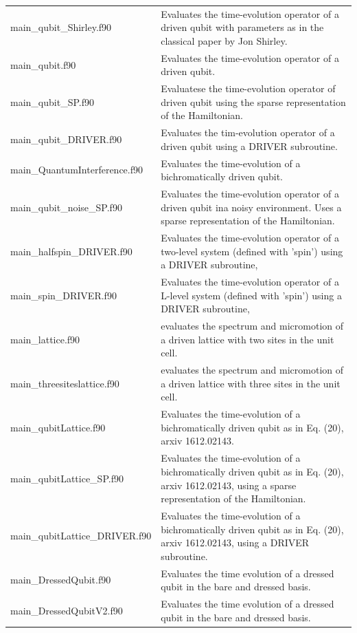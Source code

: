 \documentclass[10pt,a4paper]{article}
\begin{document}
\begin{tabular}{p{5.5cm}p{9.5cm}}
main\_qubit\_Shirley.f90 & Evaluates the time-evolution operator of a driven qubit with parameters as in the classical paper by Jon Shirley.\\
main\_qubit.f90  & Evaluates the time-evolution operator of a driven qubit.\\
main\_qubit\_SP.f90& Evaluatese the time-evolution operator of driven qubit using the sparse representation of the Hamiltonian.\\  
main\_qubit\_DRIVER.f90 & Evaluates the tim-evolution operator of a driven qubit using a DRIVER subroutine.\\
main\_QuantumInterference.f90 & Evaluates the time-evolution of a bichromatically driven qubit. \\
main\_qubit\_noise\_SP.f90 & Evaluates the time-evolution operator of a driven qubit ina noisy environment. Uses a sparse representation of the Hamiltonian. \\
main\_halfspin\_DRIVER.f90  & Evaluates the time-evolution operator of a two-level system (defined with 'spin') using a DRIVER subroutine, \\
main\_spin\_DRIVER.f90  & Evaluates the time-evolution operator of a L-level system (defined with 'spin') using a DRIVER subroutine, \\
main\_lattice.f90  &  evaluates the spectrum and micromotion of a driven lattice  with two sites in the unit cell. \\
main\_threesiteslattice.f90 & evaluates the spectrum and micromotion of a driven lattice  with three sites in the unit cell. \\
main\_qubitLattice.f90 & Evaluates the time-evolution of a bichromatically driven qubit as in   Eq. (20), arxiv 1612.02143. \\
main\_qubitLattice\_SP.f90 & Evaluates the time-evolution of a bichromatically driven qubit as in Eq. (20), arxiv 1612.02143, using a sparse representation of the Hamiltonian.  \\
main\_qubitLattice\_DRIVER.f90& Evaluates the time-evolution of a bichromatically driven qubit as in Eq. (20), arxiv 1612.02143, using a DRIVER subroutine.  \\
main\_DressedQubit.f90  & Evaluates the time evolution of a dressed qubit in the bare and dressed basis. \\
main\_DressedQubitV2.f90 & Evaluates the time evolution of a dressed qubit in the bare and dressed basis. \\

\end{tabular}
\end{document}
